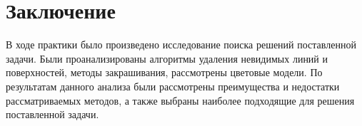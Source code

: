 \chapter{Заключение}
\label{cha:сonc}
  
  В ходе практики было произведено исследование поиска решений поставленной задачи. Были проанализированы алгоритмы удаления невидимых линий и поверхностей, методы закрашивания, рассмотрены цветовые модели. По результатам данного анализа были рассмотрены преимущества и недостатки рассматриваемых методов, а также выбраны наиболее подходящие для решения поставленной задачи.
